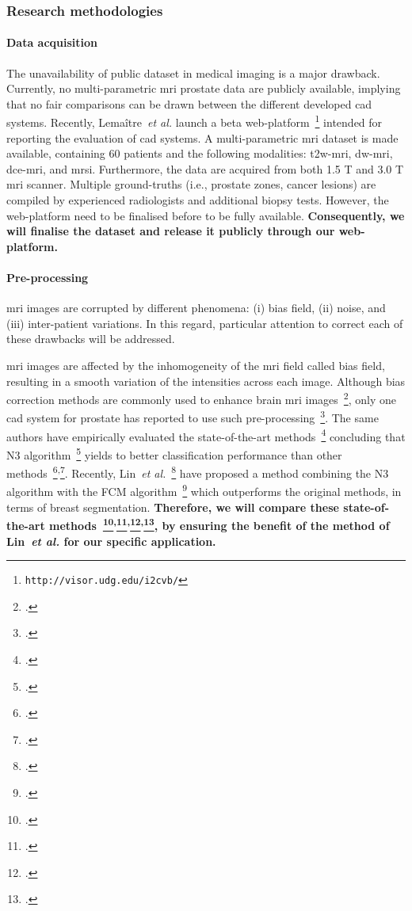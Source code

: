 \subsubsection{Research methodologies}
\label{sec:methodologies}

\paragraph{Data acquisition}

The unavailability of public dataset in medical imaging is a major drawback.
Currently, no multi-parametric \ac{mri} prostate data are publicly available, implying that no fair comparisons can be drawn between the different developed \ac{cad} systems.
Recently, Lema\^itre~\emph{et al.} launch a beta web-platform~\footnote{\texttt{http://visor.udg.edu/i2cvb/}} intended for reporting the evaluation of \ac{cad} systems.
A multi-parametric \ac{mri} dataset is made available, containing 60 patients and the following modalities: \ac{t2w}-\ac{mri}, \ac{dw}-\ac{mri}, \ac{dce}-\ac{mri}, and \ac{mrsi}.
Furthermore, the data are acquired from both 1.5 T and 3.0 T \ac{mri} scanner.
Multiple ground-truths (i.e., prostate zones, cancer lesions) are compiled by experienced radiologists and additional biopsy tests.
However, the web-platform need to be finalised before to be fully available.
\textbf{Consequently, we will finalise the dataset and release it publicly through our web-platform.}

\paragraph{Pre-processing}

\Ac{mri} images are corrupted by different phenomena: (i) bias field, (ii) noise, and (iii) inter-patient variations.
In this regard, particular attention to correct each of these drawbacks will be addressed.

\Ac{mri} images are affected by the inhomogeneity of the \ac{mri} field called bias field, resulting in a smooth variation of the intensities across each image.
Although bias correction methods are commonly used to enhance brain \ac{mri} images~\footcite{Vovk2007}, only one \ac{cad} system for prostate has reported to use such pre-processing~\footcite{Viswanath2009}.
The same authors have empirically evaluated the state-of-the-art methods~\footcite{viswanath2011empirical} concluding that N3 algorithm~\footcite{Sled1998} yields to better classification performance than other methods~\footcite{Styner2000}\textsuperscript{,}\footcite{Cohen2000}.
Recently, Lin~\emph{et al.}~\footcite{Lin2011} have proposed a method combining the N3 algorithm with the FCM algorithm~\footcite{Ahmed2002} which outperforms the original methods, in terms of breast segmentation.
\textbf{Therefore, we will compare these state-of-the-art methods~\footcite{Sled1998}\textsuperscript{,}\footcite{Styner2000}\textsuperscript{,}\footcite{Cohen2000}\textsuperscript{,}\footcite{Lin2011}, by ensuring the benefit of the method of Lin~\emph{et al.} for our specific application.}

